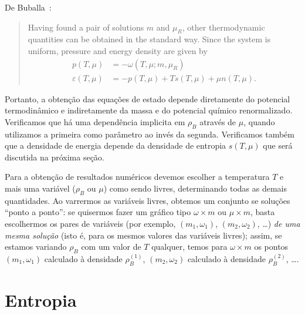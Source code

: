 De Buballa~\cite{Buballa}:
\begin{quote}
	Having found a pair of solutions $m$ and $\mu_R$, other thermodynamic quantities can be obtained in the standard way. Since the system is uniform, pressure and energy density are given by
	\begin{align}
		p(T, \mu) &= -\omega(T, \mu; m, \mu_R) \label{Exp_pressao_T}\\
		\varepsilon(T, \mu) &= -p(T, \mu) + T s(T, \mu) + \mu n(T,\mu). \label{Exp_energia_T}
	\end{align}
\end{quote}
%
Portanto, a obtenção das equações de estado depende diretamente do potencial termodinâmico e indiretamente da massa e do potencial químico renormalizado. Verificamos que há uma dependência implicita em $\rho_B$ através de $\mu$, quando utilizamos a primeira como parâmetro ao invés da segunda. Verificamos também que a densidade de energia depende da densidade de entropia $s(T, \mu)$ que será discutida na próxima seção.

Para a obtenção de resultados numéricos devemos escolher a temperatura $T$ e mais uma variável ($\rho_B$ ou $\mu$) como sendo livres, determinando todas as demais quantidades. Ao varrermos as variáveis livres, obtemos um conjunto se soluções ``ponto a ponto'': se quisermos fazer um gráfico tipo $\omega \times m$ ou $\mu \times m$, basta escolhermos os pares de variáveis (por exemplo, $(m_1, \omega_1)$, $(m_2, \omega_2)$, \dots) \emph{de uma mesma solução} (isto é, para os mesmos valores das variáveis livres); assim, se estamos variando $\rho_B$ com um valor de $T$ qualquer, temos para $\omega \times m$ os pontos $(m_1, \omega_1)$ calculado à densidade $\rho_B^{(1)}$, $(m_2, \omega_2)$ calculado à densidade $\rho_B^{(2)}$, \dots.

\section{Entropia}
\label{Sec:Entropia}

